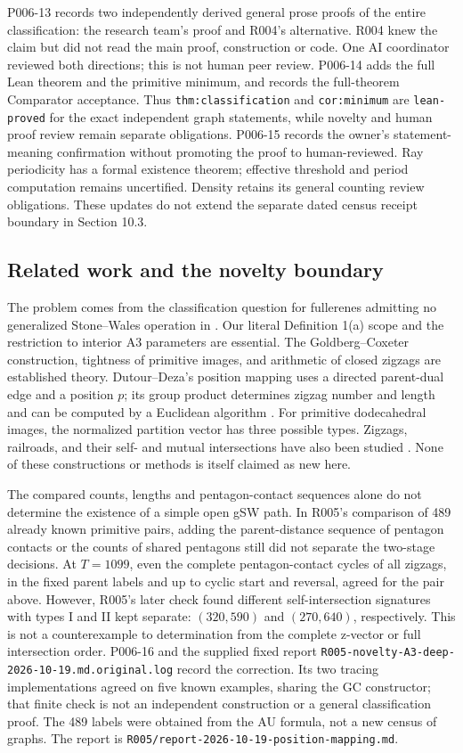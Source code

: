 \documentclass[11pt]{amsart}
\newcommand{\record}[1]{\nolinkurl{#1}}
\begin{document}
P006-13 records two independently derived general prose proofs of
the entire classification: the research team's proof and R004's
alternative. R004 knew the claim but did not read the main proof,
construction or code. One AI coordinator reviewed both directions;
this is not human peer review. P006-14 adds the full Lean theorem
and the primitive minimum, and records the full-theorem Comparator
acceptance. Thus \record{thm:classification} and \record{cor:minimum}
are \texttt{lean-proved} for the exact independent graph statements,
while novelty and human proof review remain separate obligations.
P006-15 records the owner's statement-meaning confirmation without
promoting the proof to human-reviewed. Ray
periodicity has a formal existence theorem; effective threshold and
period computation remains uncertified. Density retains its general
counting review obligations. These updates do not extend the separate
dated census receipt boundary in Section 10.3.

\subsection{Related work and the novelty boundary}
The problem comes from the classification question for fullerenes
admitting no generalized Stone--Wales operation in \cite{BBS}. Our
literal Definition 1(a) scope and the restriction to interior A3
parameters are essential. The Goldberg--Coxeter construction,
tightness of primitive images, and arithmetic of closed zigzags are
established theory. Dutour--Deza's position mapping uses a directed
parent-dual edge and a position $p$; its group product determines
zigzag number and length and can be computed by a Euclidean algorithm
\cite[Section 4, Theorems 4.5, 4.12, 6.5 and Proposition 4.14]{DD}.
For primitive dodecahedral images, the normalized partition vector has
three possible types. Zigzags, railroads, and their self- and mutual
intersections have also been studied \cite{ZZ,Knots}. None of these
constructions or methods is itself claimed as new here.

The compared counts, lengths and pentagon-contact sequences alone do
not determine the existence of a simple open gSW path. In R005's comparison of 489 already
known primitive pairs, adding the parent-distance sequence of pentagon
contacts or the counts of shared pentagons still did not separate
the two-stage decisions. At $T=1099$, even the complete pentagon-contact
cycles of all zigzags, in the fixed parent labels and up to cyclic
start and reversal, agreed for the pair above. However, R005's later
check found different self-intersection signatures with types I and II
kept separate: $(320,590)$ and $(270,640)$, respectively. This is not
a counterexample to determination from the complete z-vector or full
intersection order. P006-16 and the supplied fixed report
\record{R005-novelty-A3-deep-2026-10-19.md.original.log} record the
correction. Its two tracing implementations agreed on five known
examples, sharing the GC constructor; that finite check is not an
independent construction or a general classification proof.
The 489 labels were obtained from the AU formula, not a new census of
graphs. The report is \record{R005/report-2026-10-19-position-mapping.md}.
\end{document}
